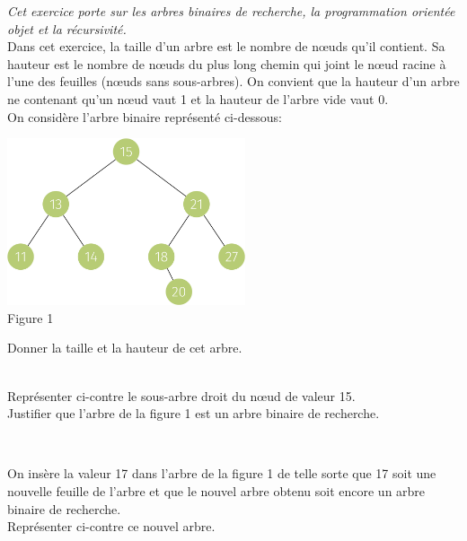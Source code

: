 \documentclass[a4paper,12pt,article,firamath]{nsi}
\begin{document}
\resetquestion
\textit{Cet exercice porte sur les arbres binaires de recherche, la programmation orientée
    objet et la récursivité.}\\

Dans cet exercice, la taille d’un arbre est le nombre de nœuds qu’il contient. Sa hauteur
est le nombre de nœuds du plus long chemin qui joint le nœud racine à l’une des
feuilles (nœuds sans sous-arbres). On convient que la hauteur d’un arbre ne contenant
qu’un nœud vaut 1 et la hauteur de l’arbre vide vaut 0.\\

On considère l’arbre binaire représenté ci-dessous:
\begin{center}
    \includegraphics[width=7cm]{img/fig1.png}\\
    Figure 1
\end{center}
Donner la taille et la hauteur de cet arbre.\\

\\

\dleft{7cm}
{
}{\question Représenter ci-contre le sous-arbre droit du n\oe ud de valeur 15.\\

    \question Justifier que l'arbre de la figure 1 est un arbre binaire de recherche.
}



\\

\dleft{7cm}
{
}{
    On insère la valeur 17 dans l’arbre de la figure 1 de telle sorte que 17 soit une
    nouvelle feuille de l’arbre et que le nouvel arbre obtenu soit encore un arbre
    binaire de recherche.\\

    \question Représenter ci-contre ce nouvel arbre.
}
\end{document}
